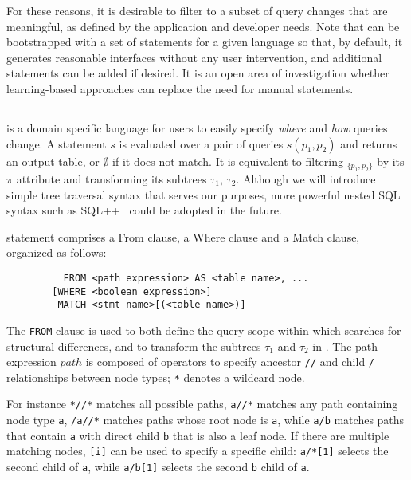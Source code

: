 For these reasons, it is desirable to filter \difftable to a subset of query changes that are meaningful, as defined by the application and developer needs.  Note that \sys can be bootstrapped with a set of \lang statements for a given language so that, by default, it generates reasonable interfaces without any user intervention, and additional \lang statements can be added if desired.  It is an open area of investigation whether learning-based approaches can replace the need for manual \lang statements.


\subsection{\lang}
\lang is a domain specific language for users to easily specify {\it where} and {\it how} queries change.  A \lang statement $s$ is evaluated over a pair of queries $s(p_1, p_2)$ and returns an output table, or $\emptyset$ if it does not match. It is equivalent to filtering \difftable$_{\{p_1, p_2\}}$ by its $\pi$ attribute and transforming its subtrees $\tau_1$, $\tau_2$.  Although we will introduce simple tree traversal syntax that serves our purposes, more powerful nested SQL syntax such as SQL++~\cite{ong2014sqlpp} could be adopted in the future.

\lang{} statement comprises a From clause, a Where clause and a Match clause, organized as follows:

{\small
\begin{verbatim}
    	  FROM <path expression> AS <table name>, ...
    	[WHERE <boolean expression>]
    	 MATCH <stmt name>[(<table name>)]\end{verbatim}}

 The \texttt{FROM} clause is used to both define the query scope within which \sys searches for structural differences, and to transform the subtrees $\tau_1$ and $\tau_2$ in \difftable.  The path expression $path$ is composed of operators to specify ancestor \texttt{//} and child \texttt{/} relationships between node types; \texttt{*} denotes a wildcard node.

For instance \texttt{*//*} matches all possible paths, \texttt{a//*} matches any path containing node type \texttt{a}, \texttt{/a//*} matches paths whose root node is \texttt{a}, while \texttt{a/b} matches paths that contain \texttt{a} with direct child \texttt{b} that is also a leaf node.  If there are multiple matching nodes, \texttt{[i]} can be used to specify a specific child: \texttt{a/*[1]} selects the second child of \texttt{a}, while \texttt{a/b[1]} selects the second \texttt{b} child of \texttt{a}.

